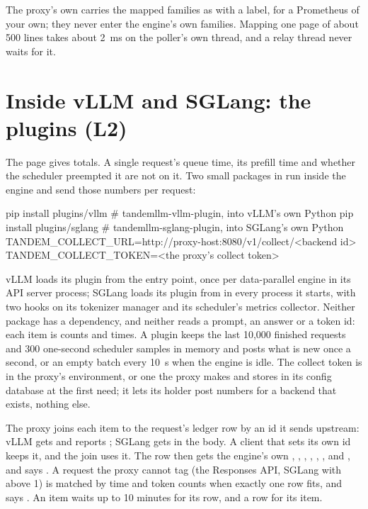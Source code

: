 The proxy's own  carries the mapped families as  with a  label, for a Prometheus of your own; they never enter the engine's own families. Mapping one page of about 500 lines takes about 2~ms on the poller's own thread, and a relay thread never waits for it.

\section{Inside vLLM and SGLang: the plugins (L2)}\label{sec:plugins}

The page gives totals. A single request's queue time, its prefill time and whether the scheduler preempted it are not on it. Two small packages in  run inside the engine and send those numbers per request:

\begin{shell}
pip install plugins/vllm        # tandemllm-vllm-plugin, into vLLM's own Python
pip install plugins/sglang      # tandemllm-sglang-plugin, into SGLang's own Python
TANDEM_COLLECT_URL=http://proxy-host:8080/v1/collect/<backend id>
TANDEM_COLLECT_TOKEN=<the proxy's collect token>
\end{shell}

vLLM loads its plugin from the  entry point, once per data-parallel engine in its API server process; SGLang loads its plugin from  in every process it starts, with two hooks on its tokenizer manager and its scheduler's metrics collector. Neither package has a dependency, and neither reads a prompt, an answer or a token id: each item is counts and times. A plugin keeps the last 10,000 finished requests and 300 one-second scheduler samples in memory and posts what is new once a second, or an empty batch every 10~s when the engine is idle. The collect token is  in the proxy's environment, or one the proxy makes and stores in its config database at the first need; it lets its holder post numbers for a backend that exists, nothing else.

The proxy joins each item to the request's ledger row by an id it sends upstream: vLLM gets  and reports ; SGLang gets  in the body. A client that sets its own id keeps it, and the join uses it. The row then gets the engine's own , , , , , ,  and , and  says . A request the proxy cannot tag (the Responses API, SGLang with  above 1) is matched by time and token counts when exactly one row fits, and says . An item waits up to 10 minutes for its row, and a row for its item.

